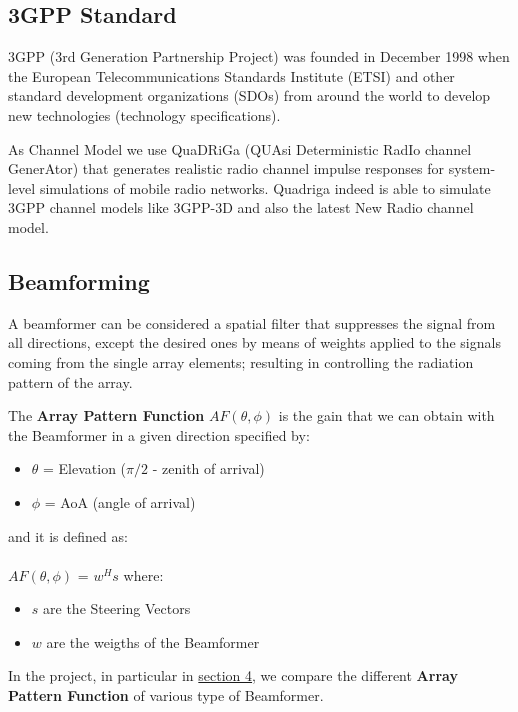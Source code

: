\subsection{3GPP Standard}

3GPP (3rd Generation Partnership Project) was founded in December 1998 when the European 
Telecommunications Standards Institute (ETSI) 
and other standard development organizations (SDOs) 
from around the world to develop new technologies (technology specifications).

As Channel Model we use QuaDRiGa (QUAsi Deterministic RadIo channel GenerAtor) that 
generates realistic radio channel impulse responses for system-level simulations of mobile radio networks. 
Quadriga indeed is able to simulate 3GPP channel models like 3GPP-3D and also the latest New Radio channel model.


\subsection{Beamforming}

A beamformer can be considered a spatial filter that suppresses
the signal from all directions, except the desired ones by means 
of weights applied to the signals coming from the single array elements;
resulting in controlling the radiation pattern of the array.

The \textbf{Array Pattern Function} $AF(\theta,\phi)$ is the gain that we can obtain with the 
Beamformer in a given direction specified by:

\begin{itemize}
    \item $\theta$ = Elevation ($\pi/2$ - zenith of arrival)
    \item $\phi$ = AoA (angle of arrival)
\end{itemize}

and it is defined as: \\\\
$AF(\theta,\phi)$ = $w^Hs$ where:
\begin{itemize}
    \item $s$ are the Steering Vectors
    \item $w$ are the weigths of the Beamformer
\end{itemize}

In the project, in particular in \hyperref[sec:antenna_array_comparison]{section 4}, we compare the different \textbf{Array Pattern Function} 
of various type of Beamformer.